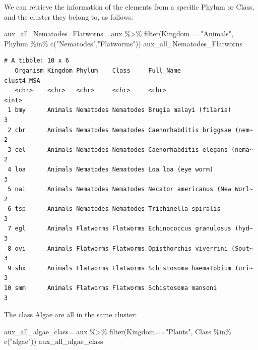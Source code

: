 \documentclass[
  letterpaper,
  DIV=11,
  numbers=noendperiod]{scrreprt}
\newenvironment{Shaded}{}{}
\newcommand{\FunctionTok}[1]{\textcolor[rgb]{0.38,0.69,0.94}{#1}}
\newcommand{\NormalTok}[1]{\textcolor[rgb]{0.67,0.70,0.75}{#1}}
\newcommand{\OtherTok}[1]{\textcolor[rgb]{0.15,0.68,0.38}{#1}}
\newcommand{\SpecialCharTok}[1]{\textcolor[rgb]{0.34,0.71,0.76}{#1}}
\newcommand{\StringTok}[1]{\textcolor[rgb]{0.60,0.76,0.47}{#1}}
\begin{document}
We can retrieve the information of the elements from a specific Phylum
or Class, and the cluster they belong to, as follows:

\begin{Shaded}
\begin{Highlighting}[]
\NormalTok{aux\_all\_Nematodes\_Flatworns}\OtherTok{=}\NormalTok{ aux }\SpecialCharTok{\%\textgreater{}\%} 
  \FunctionTok{filter}\NormalTok{(Kingdom}\SpecialCharTok{==}\StringTok{"Animals"}\NormalTok{,}
\NormalTok{         Phylum }\SpecialCharTok{\%in\%} \FunctionTok{c}\NormalTok{(}\StringTok{"Nematodes"}\NormalTok{,}\StringTok{"Flatworms"}\NormalTok{))}
\NormalTok{aux\_all\_Nematodes\_Flatworns}
\end{Highlighting}
\end{Shaded}

\begin{verbatim}
# A tibble: 10 x 6
   Organism Kingdom Phylum    Class     Full_Name                     clust4_MSA
   <chr>    <chr>   <chr>     <chr>     <chr>                              <int>
 1 bmy      Animals Nematodes Nematodes Brugia malayi (filaria)                3
 2 cbr      Animals Nematodes Nematodes Caenorhabditis briggsae (nem~          2
 3 cel      Animals Nematodes Nematodes Caenorhabditis elegans (nema~          2
 4 loa      Animals Nematodes Nematodes Loa loa (eye worm)                     3
 5 nai      Animals Nematodes Nematodes Necator americanus (New Worl~          2
 6 tsp      Animals Nematodes Nematodes Trichinella spiralis                   3
 7 egl      Animals Flatworms Flatworms Echinococcus granulosus (hyd~          3
 8 ovi      Animals Flatworms Flatworms Opisthorchis viverrini (Sout~          3
 9 shx      Animals Flatworms Flatworms Schistosoma haematobium (uri~          3
10 smm      Animals Flatworms Flatworms Schistosoma mansoni                    3
\end{verbatim}

The class Algae are all in the same cluster:

\begin{Shaded}
\begin{Highlighting}[]
\NormalTok{aux\_all\_algae\_class}\OtherTok{=}\NormalTok{ aux }\SpecialCharTok{\%\textgreater{}\%} 
  \FunctionTok{filter}\NormalTok{(Kingdom}\SpecialCharTok{==}\StringTok{"Plants"}\NormalTok{,}
\NormalTok{         Class }\SpecialCharTok{\%in\%} \FunctionTok{c}\NormalTok{(}\StringTok{"algae"}\NormalTok{))}
\NormalTok{aux\_all\_algae\_class}
\end{Highlighting}
\end{Shaded}
\end{document}
